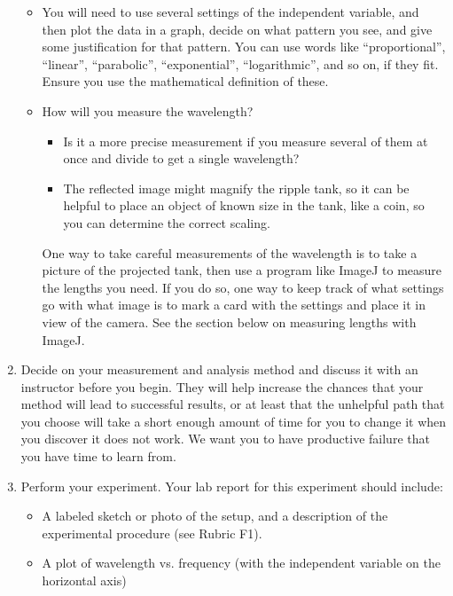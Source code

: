 \begin{enumerate}
\begin{itemize}
		\item You will need to use several settings of the independent variable, and then plot the data in a graph, decide on what pattern you see, and give some justification for that pattern. You can use words like ``proportional'', ``linear'', ``parabolic'', ``exponential'', ``logarithmic'', and so on, if they fit. Ensure you use the mathematical definition of these.
		
		\item How will you measure the wavelength?
		\begin{itemize}
			\item Is it a more precise measurement if you measure several of them at once and divide to get a single wavelength?
			
			\item The reflected image might magnify the ripple tank, so it can be helpful to place an object of known size in the tank, like a coin, so you can determine the correct scaling.
		\end{itemize}
		
		One way to take careful measurements of the wavelength is to take a picture of the projected tank, then use a program like ImageJ to measure the lengths you need. If you do so, one way to keep track of what settings go with what image is to mark a card with the settings and place it in view of the camera. See the section below on measuring lengths with ImageJ.
	\end{itemize}

	\item Decide on your measurement and analysis method and discuss it with an instructor before you begin. They will help increase the chances that your method will lead to successful results, or at least that the unhelpful path that you choose will take a short enough amount of time for you to change it when you discover it does not work. We want you to have productive failure that you have time to learn from.
	
	\item Perform your experiment. Your lab report for this experiment should include:
	\begin{itemize}
		\item A labeled sketch or photo of the setup, and a description of the experimental procedure (see Rubric F1).
		
		\item A plot of wavelength vs. frequency (with the independent variable on the horizontal axis)
		

\end{itemize}
\end{enumerate}
